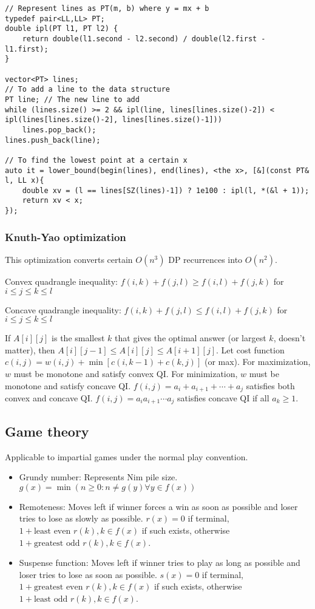 \documentclass[letterpaper]{article}
\begin{document}
\begin{lstlisting}
// Represent lines as PT(m, b) where y = mx + b
typedef pair<LL,LL> PT;
double ipl(PT l1, PT l2) {
	return double(l1.second - l2.second) / double(l2.first - l1.first);
}

vector<PT> lines;
// To add a line to the data structure
PT line; // The new line to add
while (lines.size() >= 2 && ipl(line, lines[lines.size()-2]) < ipl(lines[lines.size()-2], lines[lines.size()-1]))
	lines.pop_back();
lines.push_back(line);

// To find the lowest point at a certain x
auto it = lower_bound(begin(lines), end(lines), <the x>, [&](const PT& l, LL x){
	double xv = (l == lines[SZ(lines)-1]) ? 1e100 : ipl(l, *(&l + 1));
	return xv < x;
});
\end{lstlisting}

\subsubsection{Knuth-Yao optimization}

This optimization converts certain $O(n^3)$ DP recurrences into $O(n^2)$.

Convex quadrangle inequality: $f(i,k) + f(j,l) \geq f(i,l) + f(j,k)$ for $i \leq j \leq k \leq l$

Concave quadrangle inequality: $f(i,k) + f(j,l) \leq f(i,l) + f(j,k)$ for $i \leq j \leq k \leq l$

If $A[i][j]$ is the smallest $k$ that gives the optimal answer (or largest $k$, doesn't matter), then $A[i][j-1] \leq A[i][j] \leq A[i+1][j]$. Let cost function $c(i,j) = w(i,j) + \min\left[c(i,k-1) + c(k,j)\right]$ (or max). For maximization, $w$ must be monotone and satisfy convex QI. For minimization, $w$ must be monotone and satisfy concave QI. $f(i,j) = a_i + a_{i+1} + \cdots + a_j$ satisfies both convex and concave QI. $f(i,j) = a_ia_{i+1}\cdots a_j$ satisfies concave QI if all $a_k \geq 1$.

\subsection{Game theory}
Applicable to impartial games under the normal play convention.
\begin{itemize}
    \item Grundy number: Represents Nim pile size. $g\left(x\right) = \min\left(n \geq 0 : n \neq g\left(y\right) \forall y \in f\left(x\right)\right)$
    \item Remoteness: Moves left if winner forces a win as soon as possible and loser tries to lose as slowly as possible. $r\left(x\right) = 0$ if terminal, $1 + \text{least even } r(k), k \in f\left(x\right)$ if such exists, otherwise $1 + \text{greatest odd } r(k), k \in f\left(x\right)$.
    \item Suspense function: Moves left if winner tries to play as long as possible and loser tries to lose as soon as possible. $s\left(x\right) = 0$ if terminal, $1 + \text{greatest even } r(k), k \in f\left(x\right)$ if such exists, otherwise $1 + \text{least odd } r(k), k \in f\left(x\right)$.
\end{itemize}
\end{document}

